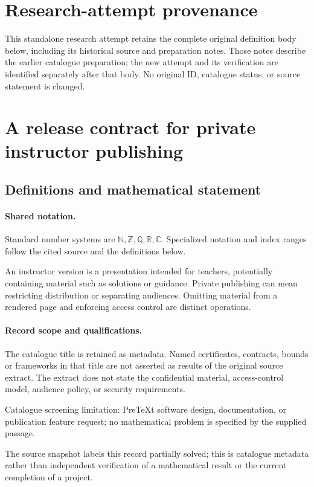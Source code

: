\documentclass[11pt]{article}
\begin{document}
\section*{Research-attempt provenance}
This standalone research attempt retains the complete original definition body below,
including its historical source and preparation notes. Those notes describe the
earlier catalogue preparation; the new attempt and its verification are identified
separately after that body. No original ID, catalogue status, or source statement is changed.

\section{A release contract for private instructor publishing}\label{statement}

\subsection{Definitions and mathematical statement}

\paragraph{Shared notation.}Standard number systems are $\mathbb N,\mathbb Z,\mathbb Q,\mathbb R,\mathbb C$. Specialized notation and index ranges follow the cited source and the definitions below.


An instructor version is a presentation intended for teachers, potentially containing material such as solutions or guidance. Private publishing can mean restricting distribution or separating audiences. Omitting material from a rendered page and enforcing access control are distinct operations.
\paragraph{Record scope and qualifications.}
The catalogue title is retained as metadata. Named certificates, contracts, bounds or frameworks in that title are not asserted as results of the original source extract.
The extract does not state the confidential material, access-control model, audience policy, or security requirements.

Catalogue screening limitation: PreTeXt software design, documentation, or publication feature request; no mathematical problem is specified by the supplied passage.

The source snapshot labels this record partially solved; this is catalogue metadata rather than independent verification of a mathematical result or the current completion of a project.
\end{document}
